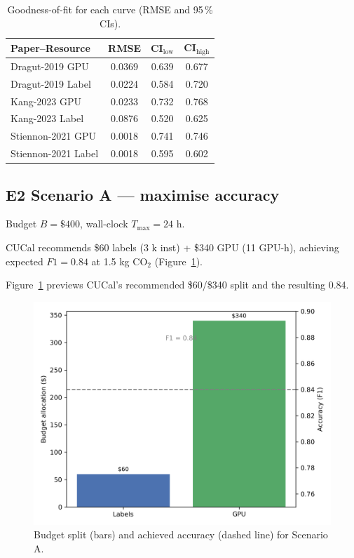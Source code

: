 \documentclass[11pt]{article}
\begin{document}
\begin{table}[ht]
  \centering
  \caption{Goodness-of-fit for each curve (RMSE and 95\,\% CIs).}
  \label{tab:rmse}             %
  \begin{tabular}{lccc}
    \toprule
    Paper–Resource            & RMSE  & CI$_\text{low}$ & CI$_\text{high}$ \\
    \midrule
    Dragut-2019 GPU           & 0.0369 & 0.639 & 0.677 \\
    Dragut-2019 Label         & 0.0224 & 0.584 & 0.720 \\
    Kang-2023 GPU             & 0.0233 & 0.732 & 0.768 \\
    Kang-2023 Label           & 0.0876 & 0.520 & 0.625 \\
    Stiennon-2021 GPU         & 0.0018 & 0.741 & 0.746 \\
    Stiennon-2021 Label       & 0.0018 & 0.595 & 0.602 \\
    \bottomrule
  \end{tabular}
\end{table}


\subsection{E2 Scenario A — maximise accuracy}
Budget \(B=\$400\), wall-clock \(T_{\max}=24\) h.

CUCal recommends \$60 labels (3 k inst) + \$340 GPU (11 GPU-h),
achieving expected \(F1=0.84\) at 1.5 kg CO\(_2\)
(Figure~\ref{fig:scenarioA}).

Figure~\ref{fig:scenarioA} previews CUCal’s recommended \$60/\$340 split
and the resulting \SI{0.84}{\fOneScore}.

\begin{figure}[htbp]
  \centering
  \includegraphics[width=.75\linewidth]{figures/scenarioA.png}
  \caption{Budget split (bars) and achieved accuracy (dashed line) for Scenario A.}
  \label{fig:scenarioA}
\end{figure}
\end{document}
